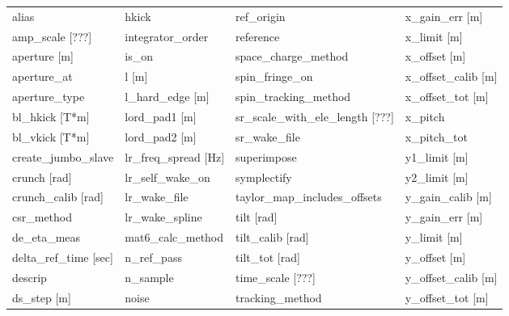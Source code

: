  \begin{tabular}{llll} \toprule
alias                          & hkick                          & ref_origin                     & x_gain_err [m]                 \\
amp_scale [???]                & integrator_order               & reference                      & x_limit [m]                    \\
aperture [m]                   & is_on                          & space_charge_method            & x_offset [m]                   \\
aperture_at                    & l [m]                          & spin_fringe_on                 & x_offset_calib [m]             \\
aperture_type                  & l_hard_edge [m]                & spin_tracking_method           & x_offset_tot [m]               \\
bl_hkick [T*m]                 & lord_pad1 [m]                  & sr_scale_with_ele_length [???] & x_pitch                        \\
bl_vkick [T*m]                 & lord_pad2 [m]                  & sr_wake_file                   & x_pitch_tot                    \\
create_jumbo_slave             & lr_freq_spread [Hz]            & superimpose                    & y1_limit [m]                   \\
crunch [rad]                   & lr_self_wake_on                & symplectify                    & y2_limit [m]                   \\
crunch_calib [rad]             & lr_wake_file                   & taylor_map_includes_offsets    & y_gain_calib [m]               \\
csr_method                     & lr_wake_spline                 & tilt [rad]                     & y_gain_err [m]                 \\
de_eta_meas                    & mat6_calc_method               & tilt_calib [rad]               & y_limit [m]                    \\
delta_ref_time [sec]           & n_ref_pass                     & tilt_tot [rad]                 & y_offset [m]                   \\
descrip                        & n_sample                       & time_scale [???]               & y_offset_calib [m]             \\
ds_step [m]                    & noise                          & tracking_method                & y_offset_tot [m]               \\

\end{tabular}
